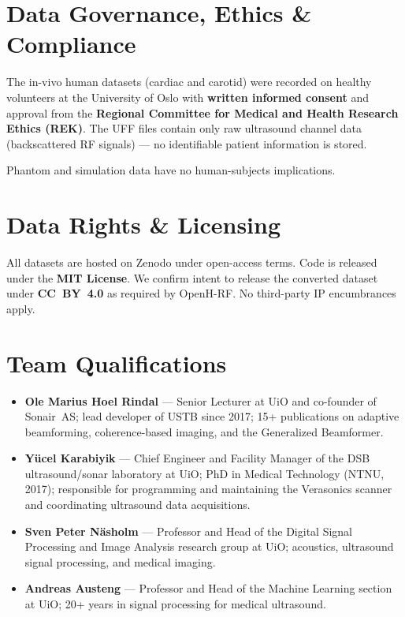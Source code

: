 \documentclass[11pt,a4paper]{article}
\begin{document}
\section{Data Governance, Ethics \& Compliance}

The in-vivo human datasets (cardiac and carotid) were recorded on healthy volunteers at the University of Oslo with \textbf{written informed consent} and approval from the \textbf{Regional Committee for Medical and Health Research Ethics (REK)}.
The UFF files contain only raw ultrasound channel data (backscattered RF signals) --- no identifiable patient information is stored.

Phantom and simulation data have no human-subjects implications.

\section{Data Rights \& Licensing}

All datasets are hosted on Zenodo under open-access terms.
Code is released under the \textbf{MIT License}.
We confirm intent to release the converted dataset under \textbf{CC~BY~4.0} as required by OpenH-RF.
No third-party IP encumbrances apply.

\section{Team Qualifications}

\begin{itemize}[nosep]
  \item \textbf{Ole Marius Hoel Rindal} --- Senior Lecturer at UiO and co-founder of Sonair~AS; lead developer of USTB since 2017; 15+ publications on adaptive beamforming, coherence-based imaging, and the Generalized Beamformer.
  \item \textbf{Y\"ucel Karabiyik} --- Chief Engineer and Facility Manager of the DSB ultrasound/sonar laboratory at UiO; PhD in Medical Technology (NTNU, 2017); responsible for programming and maintaining the Verasonics scanner and coordinating ultrasound data acquisitions.
  \item \textbf{Sven Peter N\"asholm} --- Professor and Head of the Digital Signal Processing and Image Analysis research group at UiO; acoustics, ultrasound signal processing, and medical imaging.
  \item \textbf{Andreas Austeng} --- Professor and Head of the Machine Learning section at UiO; 20+ years in signal processing for medical ultrasound.
\end{itemize}
\end{document}
